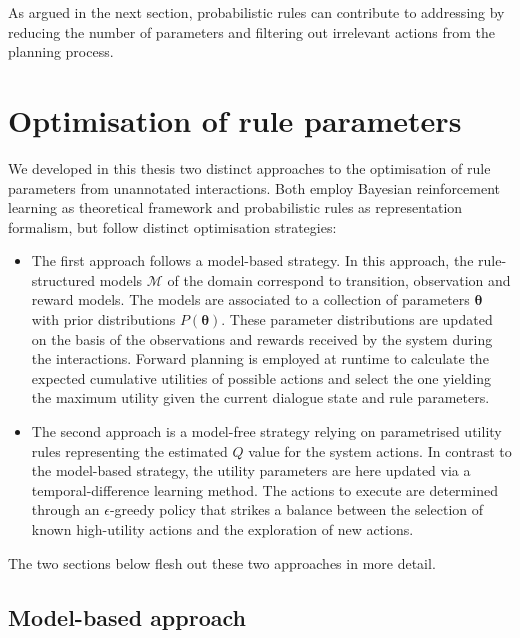As argued in the next section, probabilistic rules can contribute to addressing by reducing the number of parameters and filtering out irrelevant actions from the planning process.

\section{Optimisation of rule parameters}
\label{sec:rl-ruleparams}

We developed in this thesis two distinct approaches to the optimisation of rule parameters from unannotated interactions. Both employ Bayesian reinforcement learning as theoretical framework and probabilistic rules as representation formalism, but follow distinct optimisation strategies:

\begin{itemize}
\item The first approach follows a model-based strategy.  In this approach, the rule-structured models $\mathcal{M}$ of the domain correspond to transition, observation and reward models. The models are associated to a collection of parameters $\boldsymbol\theta$ with prior distributions $P(\boldsymbol\theta)$.  These parameter distributions are updated on the basis of the observations and rewards received by the system during the interactions. Forward planning is employed at runtime to calculate the expected cumulative utilities of possible actions and select the one yielding the maximum utility given the current dialogue state and rule parameters. 

\item The second approach is a model-free strategy relying on parametrised utility rules representing the estimated $Q$ value for the system actions. In contrast to the model-based strategy, the utility parameters are here updated via a temporal-difference learning method.  The actions to execute are determined through an $\epsilon$-greedy policy that strikes a balance between the selection of known high-utility actions and the exploration of new actions.

\end{itemize}

The two sections below flesh out these two approaches in more detail. 

\subsection{Model-based approach}
\label{sec:modelbased}

